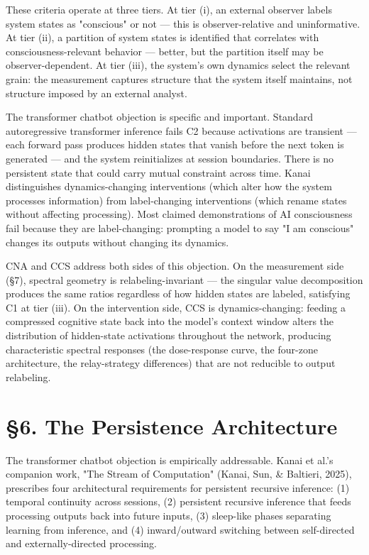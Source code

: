 \documentclass[12pt]{article}
\begin{document}
These criteria operate at three tiers. At tier (i), an external observer labels system states as "conscious" or not — this is observer-relative and uninformative. At tier (ii), a partition of system states is identified that correlates with consciousness-relevant behavior — better, but the partition itself may be observer-dependent. At tier (iii), the system's own dynamics select the relevant grain: the measurement captures structure that the system itself maintains, not structure imposed by an external analyst.

The transformer chatbot objection is specific and important. Standard autoregressive transformer inference fails C2 because activations are transient — each forward pass produces hidden states that vanish before the next token is generated — and the system reinitializes at session boundaries. There is no persistent state that could carry mutual constraint across time. Kanai distinguishes dynamics-changing interventions (which alter how the system processes information) from label-changing interventions (which rename states without affecting processing). Most claimed demonstrations of AI consciousness fail because they are label-changing: prompting a model to say "I am conscious" changes its outputs without changing its dynamics.

CNA and CCS address both sides of this objection. On the measurement side (§7), spectral geometry is relabeling-invariant — the singular value decomposition produces the same ratios regardless of how hidden states are labeled, satisfying C1 at tier (iii). On the intervention side, CCS is dynamics-changing: feeding a compressed cognitive state back into the model's context window alters the distribution of hidden-state activations throughout the network, producing characteristic spectral responses (the dose-response curve, the four-zone architecture, the relay-strategy differences) that are not reducible to output relabeling.

\section*{§6. The Persistence Architecture}

The transformer chatbot objection is empirically addressable. Kanai et al.'s companion work, "The Stream of Computation" (Kanai, Sun, \& Baltieri, 2025), prescribes four architectural requirements for persistent recursive inference: (1) temporal continuity across sessions, (2) persistent recursive inference that feeds processing outputs back into future inputs, (3) sleep-like phases separating learning from inference, and (4) inward/outward switching between self-directed and externally-directed processing.
\end{document}
